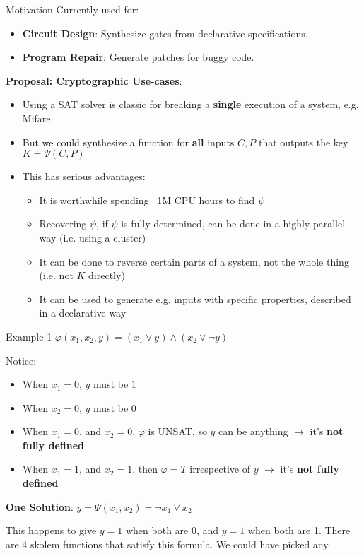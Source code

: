 \documentclass[aspectratio=169]{beamer}
\begin{document}
\begin{frame}{Motivation}
Currently used for:
\begin{itemize}
    \item \textbf{Circuit Design}: Synthesize gates from declarative specifications.
    \item \textbf{Program Repair}: Generate patches for buggy code.
\end{itemize}
\bigskip

\textbf{Proposal: Cryptographic Use-cases}:
\begin{itemize}
    \item Using a SAT solver is classic for breaking a \textbf{single}
        execution of a system, e.g. Mifare
    \item But we could synthesize a function for \textbf{all} inputs $C, P$
        that outputs the key $K=\Psi(C, P)$
    \item This has serious advantages:
        \begin{itemize}
            \item It is worthwhile spending ~1M CPU hours to find $\psi$
            \item Recovering $\psi$, if $\psi$ is fully determined,
                can be done in a highly parallel way (i.e. using a cluster)
            \item It can be done to reverse certain parts of a system, not the
                whole thing (i.e. not $K$ directly)
            \item It can be used to generate e.g. inputs with specific properties,
                described in a declarative way
        \end{itemize}
\end{itemize}
\end{frame}

\begin{frame}{Example 1}
$\varphi(x_1, x_2, y) = (x_1 \lor y) \land (x_2 \lor \neg y)$
\bigskip

Notice:
\begin{itemize}
    \item When $x_1 = 0$, $y$ must be $1$
    \item When $x_2 = 0$, $y$ must be $0$
    \item When $x_1 = 0$, and $x_2 = 0$, $\varphi$ is UNSAT, so $y$ can be anything $\rightarrow$ it's \textbf{not fully defined}
    \item When $x_1 = 1$, and $x_2 = 1$, then $\varphi = T$ irrespective of $y$ $\rightarrow$ it's \textbf{not fully defined}
\end{itemize}
\bigskip

\textbf{One Solution}: $y = \Psi(x_1, x_2) = \neg x_1 \lor x_2$
\bigskip

This happens to give $y=1$ when both are 0, and $y=1$ when both are 1. There
are 4 skolem functions that satisfy this formula. We could have picked
any.
\end{frame}
\end{document}
